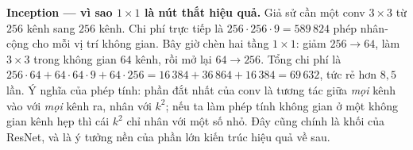 \documentclass[../../../deep_learning.tex]{subfiles}
\begin{document}
\textbf{Inception --- vì sao \(1\times1\) là nút thắt hiệu quả.} Giả sử cần một conv \(3\times3\) từ \(256\) kênh sang \(256\) kênh. Chi phí trực tiếp là \(256\cdot 256\cdot 9 = 589\,824\) phép nhân-cộng cho mỗi vị trí không gian. Bây giờ chèn hai tầng \(1\times1\): giảm \(256 \rightarrow 64\), làm \(3\times3\) trong không gian \(64\) kênh, rồi mở lại \(64 \rightarrow 256\). Tổng chi phí là \(256\cdot 64 + 64\cdot 64\cdot 9 + 64\cdot 256 = 16\,384 + 36\,864 + 16\,384 = 69\,632\), tức rẻ hơn \(8{,}5\) lần. Ý nghĩa của phép tính: phần đắt nhất của conv là tương tác giữa \emph{mọi} kênh vào với \emph{mọi} kênh ra, nhân với \(k^2\); nếu ta làm phép tính không gian ở một không gian kênh hẹp thì cái \(k^2\) chỉ nhân với một số nhỏ. Đây cũng chính là khối  của ResNet, và là ý tưởng nền của phần lớn kiến trúc hiệu quả về sau.
\end{document}
